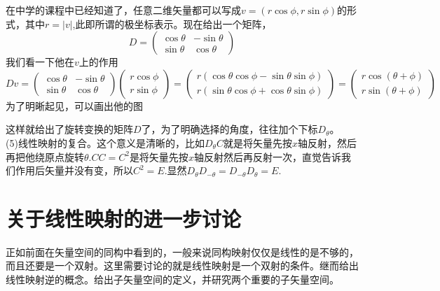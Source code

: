 \documentclass[11pt,a4paper,openany]{book}%
\theoremstyle{plain}%
\begin{document}
在中学的课程中已经知道了，任意二维矢量都可以写成$v=(r\cos \phi,r\sin \phi)$的形式，其中$r=|v|$,此即所谓的极坐标表示。现在给出一个矩阵，
\begin{equation}
D=\begin{pmatrix}
\cos \theta&-\sin \theta\\
\sin \theta&\cos \theta
\end{pmatrix}
\end{equation}
我们看一下他在$v$上的作用
\[
Dv=\begin{pmatrix}
\cos \theta&-\sin \theta\\
\sin \theta&\cos \theta
\end{pmatrix}
\begin{pmatrix}
r \cos \phi\\
r\sin \phi
\end{pmatrix}
=
\begin{pmatrix}
r(\cos \theta \cos \phi-\sin \theta \sin \phi) \\
r(\sin \theta \cos \phi+\cos \theta \sin \phi)
\end{pmatrix}
=
\begin{pmatrix}
r\cos (\theta + \phi) \\
r\sin (\theta + \phi)
\end{pmatrix}
\]
为了明晰起见，可以画出他的图
\begin{center}
\end{center}
这样就给出了旋转变换的矩阵$D$了，为了明确选择的角度，往往加个下标$D_\theta$。\\
(5)线性映射的复合。这个意义是清晰的，比如$D_\theta C$就是将矢量先按$x$轴反射，然后再把他绕原点旋转$\theta$.$CC=C^2$是将矢量先按$x$轴反射然后再反射一次，直觉告诉我们作用后矢量并没有变，所以$C^2=E$.显然$D_\theta D_{-\theta}=D_{-\theta}D_\theta=E$.
\section{关于线性映射的进一步讨论}
正如前面在矢量空间的同构中看到的，一般来说同构映射仅仅是线性的是不够的，而且还要是一个双射。这里需要讨论的就是线性映射是一个双射的条件。继而给出线性映射逆的概念。给出子矢量空间的定义，并研究两个重要的子矢量空间。
\end{document}
